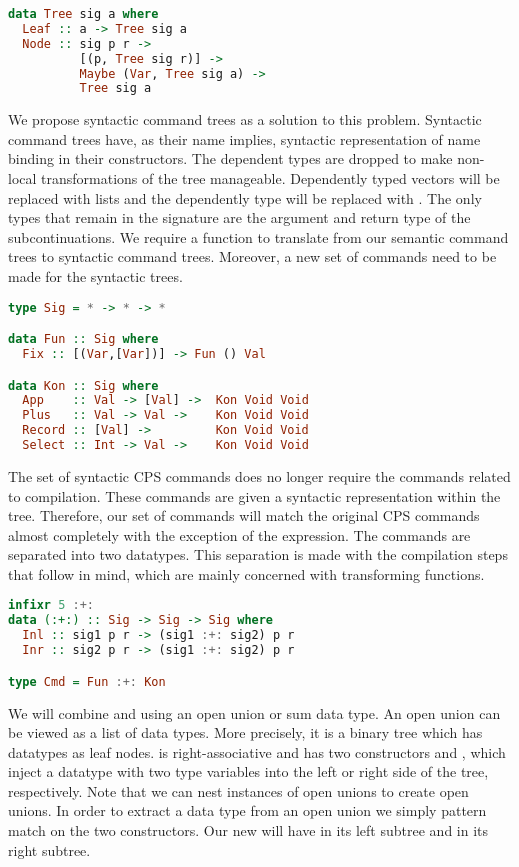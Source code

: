 \begin{lstlisting}[language=Haskell]
data Tree sig a where
  Leaf :: a -> Tree sig a
  Node :: sig p r ->
          [(p, Tree sig r)] ->
          Maybe (Var, Tree sig a) ->
          Tree sig a
\end{lstlisting}

We propose syntactic command trees as a solution to this problem. Syntactic command trees have, as their name implies, syntactic representation of name binding in their constructors. The dependent types are dropped to make non-local transformations of the tree manageable. Dependently typed vectors will be replaced with lists and the dependently type  will be replaced with . The only types that remain in the signature are the argument  and return type  of the subcontinuations. We require a function to translate from our semantic command trees to syntactic command trees. Moreover, a new set of commands need to be made for the syntactic trees.

\begin{lstlisting}[language=Haskell]
type Sig = * -> * -> *

data Fun :: Sig where
  Fix :: [(Var,[Var])] -> Fun () Val

data Kon :: Sig where
  App    :: Val -> [Val] ->  Kon Void Void
  Plus   :: Val -> Val ->    Kon Void Void
  Record :: [Val] ->         Kon Void Void
  Select :: Int -> Val ->    Kon Void Void
\end{lstlisting}

The set of syntactic \ac{CPS} commands does no longer require the commands related to compilation. These commands are given a syntactic representation within the tree. Therefore, our set of commands will match the original \ac{CPS} commands almost completely with the exception of the  expression. The commands are separated into two datatypes. This separation is made with the compilation steps that follow in mind, which are mainly concerned with transforming functions.

\begin{lstlisting}[language=Haskell]
infixr 5 :+:
data (:+:) :: Sig -> Sig -> Sig where
  Inl :: sig1 p r -> (sig1 :+: sig2) p r
  Inr :: sig2 p r -> (sig1 :+: sig2) p r

type Cmd = Fun :+: Kon
\end{lstlisting}

We will combine  and  using an open union or sum data type. An open union can be viewed as a list of data types. More precisely, it is a binary tree which has datatypes as leaf nodes. \icode{:+:} is right-associative and has two constructors  and , which inject a datatype with two type variables into the left or right side of the tree, respectively. Note that we can nest instances of open unions to create open unions. In order to extract a data type from an open union we simply pattern match on the two constructors. Our new  will have  in its left subtree and  in its right subtree.

